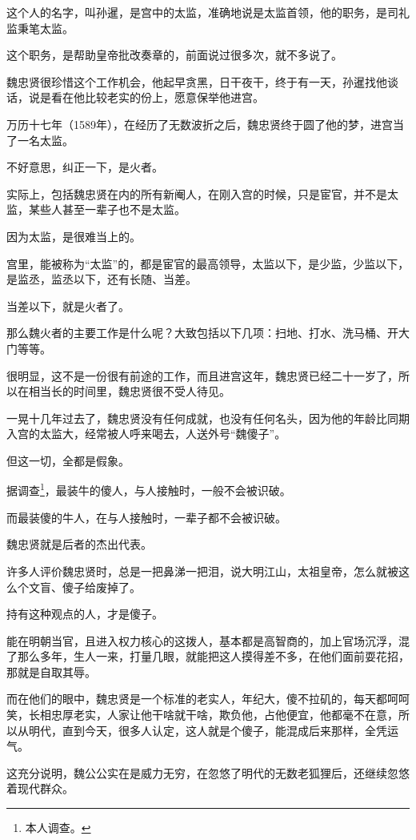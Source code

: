 \begin{multicols}{\theparacolNo}
		这个人的名字，叫孙暹，是宫中的太监，准确地说是太监首领，他的职务，是司礼监秉笔太监。

		这个职务，是帮助皇帝批改奏章的，前面说过很多次，就不多说了。

		魏忠贤很珍惜这个工作机会，他起早贪黑，日干夜干，终于有一天，孙暹找他谈话，说是看在他比较老实的份上，愿意保举他进宫。

		万历十七年（1589年），在经历了无数波折之后，魏忠贤终于圆了他的梦，进宫当了一名太监。

		不好意思，纠正一下，是火者。

		实际上，包括魏忠贤在内的所有新阉人，在刚入宫的时候，只是宦官，并不是太监，某些人甚至一辈子也不是太监。

		因为太监，是很难当上的。

		宫里，能被称为“太监”的，都是宦官的最高领导，太监以下，是少监，少监以下，是监丞，监丞以下，还有长随、当差。

		当差以下，就是火者了。

		那么魏火者的主要工作是什么呢？大致包括以下几项：扫地、打水、洗马桶、开大门等等。

		很明显，这不是一份很有前途的工作，而且进宫这年，魏忠贤已经二十一岁了，所以在相当长的时间里，魏忠贤很不受人待见。

		一晃十几年过去了，魏忠贤没有任何成就，也没有任何名头，因为他的年龄比同期入宫的太监大，经常被人呼来喝去，人送外号“魏傻子”。

		但这一切，全都是假象。

		据调查\footnote{本人调查。}，最装牛的傻人，与人接触时，一般不会被识破。

		而最装傻的牛人，在与人接触时，一辈子都不会被识破。

		魏忠贤就是后者的杰出代表。

		许多人评价魏忠贤时，总是一把鼻涕一把泪，说大明江山，太祖皇帝，怎么就被这么个文盲、傻子给废掉了。

		持有这种观点的人，才是傻子。

		能在明朝当官，且进入权力核心的这拨人，基本都是高智商的，加上官场沉浮，混了那么多年，生人一来，打量几眼，就能把这人摸得差不多，在他们面前耍花招，那就是自取其辱。

		而在他们的眼中，魏忠贤是一个标准的老实人，年纪大，傻不拉矶的，每天都呵呵笑，长相忠厚老实，人家让他干啥就干啥，欺负他，占他便宜，他都毫不在意，所以从明代，直到今天，很多人认定，这人就是个傻子，能混成后来那样，全凭运气。

		这充分说明，魏公公实在是威力无穷，在忽悠了明代的无数老狐狸后，还继续忽悠着现代群众。


\end{multicols}
